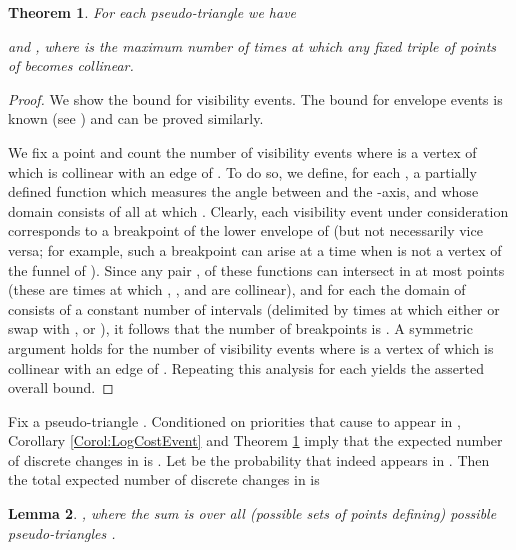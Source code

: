 \documentclass[11pt]{article}
\newtheorem{theorem}{Theorem}[section]
\newtheorem{lemma}[theorem]{Lemma}
\begin{document}
\begin{theorem}\label{Theorem:QuadEvents}
  For each pseudo-triangle  we have
  
and   , where  is the
  maximum number of times at which any fixed triple of points of 
  becomes collinear.
\end{theorem}
\begin{proof}
  We show the bound for visibility events. The bound for envelope
  events is known (see \cite{ABG,AKS}) and can be proved similarly.  

We fix a point  and count the number of visibility events where  is a
  vertex of  which is collinear with an edge of .
  To do so, we define, for each , a
  partially defined function  which measures the
  angle between  and the -axis, and whose domain consists of
  all  at which .  Clearly, each
  visibility event under consideration corresponds to a breakpoint of
  the lower envelope of  (but not necessarily vice versa; for example, such a breakpoint can arise at a time when  is not a vertex of the funnel of ). Since any pair
  ,  of these functions can intersect
  in at most  points (these are times at which , , and  are
  collinear),
and for each
 the domain of   
consists of a constant number of intervals (delimited by times at which either  or  swap with , or ), it follows that the number of
  breakpoints is  \cite{SA:ds}.  A
  symmetric argument holds for the number of visibility events where
   is a vertex of  which is collinear with an edge of
  . Repeating this analysis for each  yields the
  asserted overall bound.
\end{proof}



Fix a pseudo-triangle . Conditioned on  priorities that
cause  to appear in , Corollary \ref{Corol:LogCostEvent} and Theorem \ref{Theorem:QuadEvents} imply
that the expected number of discrete changes in  is 
. 
Let  be the probability that  indeed
appears in . Then the total expected number of discrete 
changes in  
is




\begin{lemma}\label{Lemma:BoundSumQuads} 
, where the sum is over all (possible sets of  points defining) possible pseudo-triangles .
\end{lemma}
\end{document}
